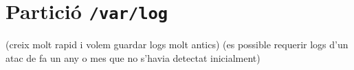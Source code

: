 
\section{Partició \texttt{/var/log}}%
\label{sec:part_var_log}

\begin{itemize}
     (creix molt rapid i volem guardar logs molt antics)
     (es possible requerir logs d'un atac de fa un any o mes que no s'havia detectat inicialment)
\end{itemize}
